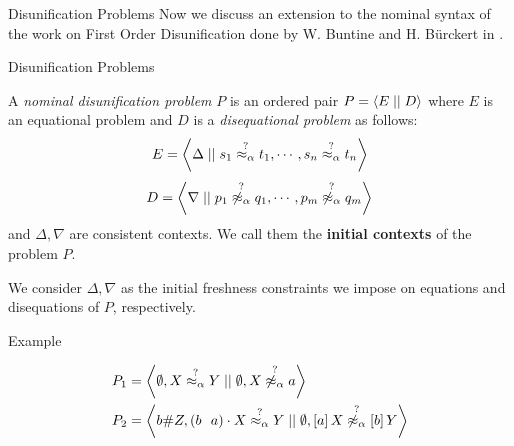 \documentclass{beamer}
\begin{document}
    \begin{frame}{Disunification Problems}
        Now we discuss an extension to the nominal syntax of the work on First Order Disunification done by W. Buntine and H. B\"{u}rckert in \cite{Buntine:1994:SED:179812.179813}.
    \end{frame}

    \begin{frame}{Disunification Problems}
        \begin{definition}
            A \textit{nominal disunification problem} $P$ is an ordered pair $P = \left\langle E \mid\mid D \right\rangle$ where $E$ is an equational problem and $D$ is a \textit{disequational problem} as follows:
            $$E = \left\langle \Delta \mid\mid s_1 \overset{?}{\mathrel{\approx_\alpha}} t_1, \cdots, s_n \overset{?}{\mathrel{\approx_\alpha}} t_n \right\rangle$$
            $$D = \left\langle \nabla \mid\mid p_1 \overset{?}{\mathrel{\not\approx_\alpha}} q_1, \cdots, p_m \overset{?}{\mathrel{\not\approx_\alpha}} q_m \right\rangle$$
            and $\Delta, \nabla$ are consistent contexts. We call them the \textbf{initial contexts} of the problem $P$.
        \end{definition}

        \begin{remark}
            We consider $\Delta, \nabla$ as the initial freshness constraints we impose on equations and disequations of $P$, respectively.
        \end{remark}
    \end{frame}

    \begin{frame}{Example}
        \begin{example}
            \begin{align*}
                P_1 & = \left\langle \emptyset, X \overset{?}{\mathrel{\approx_\alpha}} Y  \mid\mid \emptyset, X \overset{?}{\mathrel{\not\approx_\alpha}} a \right\rangle                                             \\
                P_2 & = \left\langle b\# Z, (b \ \ a) \cdot X \overset{?}{\mathrel{\approx_\alpha}} Y \mid\mid \emptyset, \left[ a \right]X \overset{?}{\mathrel{\not\approx_\alpha}} \left[ b \right]Y \right\rangle
            \end{align*}
        \end{example}
    \end{frame}
\end{document}

